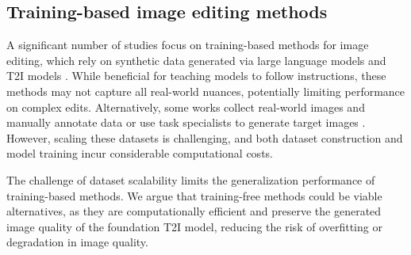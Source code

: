 \documentclass{article}
\begin{document}
\subsection{Training-based image editing methods}


A significant number of studies focus on training-based methods for image editing, which rely on synthetic data generated via large language models and T2I models \citep{brooks2023instructpix2pix, hui2024hq}. While beneficial for teaching models to follow instructions, these methods may not capture all real-world nuances, potentially limiting performance on complex edits. Alternatively, some works collect real-world images and manually annotate data or use task specialists to generate target images \citep{zhang2023magicbrush, wasserman2024paint, wei2024omniedit}. However, scaling these datasets is challenging, and both dataset construction and model training incur considerable computational costs.

The challenge of dataset scalability limits the generalization performance of training-based methods. We argue that training-free methods could be viable alternatives, as they are computationally efficient and preserve the generated image quality of the foundation T2I model, reducing the risk of overfitting or degradation in image quality.




\end{document}
